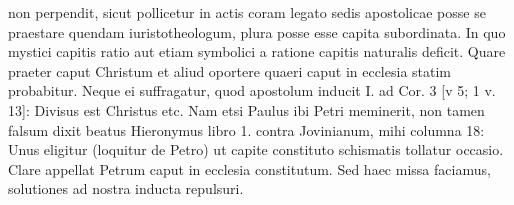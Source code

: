 non perpendit, sicut pollicetur in actis coram legato sedis apostolicae posse se praestare quendam iuristotheologum, plura posse esse capita subordinata. In quo mystici capitis ratio aut etiam symbolici a ratione capitis naturalis deficit. Quare praeter caput Christum et aliud oportere quaeri caput in ecclesia statim probabitur. Neque ei suffragatur, quod apostolum inducit I. ad Cor. 3 [v 5; 1 v. 13]: Divisus est Christus etc. Nam etsi Paulus ibi Petri meminerit, non tamen falsum dixit beatus Hieronymus libro 1. contra Jovinianum, mihi columna 18: Unus eligitur (loquitur de Petro) ut capite constituto schismatis tollatur occasio. Clare appellat Petrum caput in ecclesia constitutum. Sed haec missa faciamus, solutiones ad nostra inducta repulsuri.

